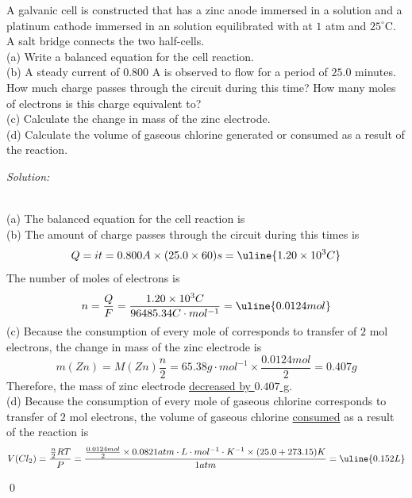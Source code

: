 \documentclass[12pt]{article}
\newenvironment{problem}[2][Problem]{\begin{trivlist}
\item[\hskip \labelsep {\bfseries #1}\hskip \labelsep {\bfseries #2.}]}{\end{trivlist}}
\newenvironment{sol}
    {\emph{Solution:}
    }
    {
    \qed
    }
\begin{document}
\begin{problem}{17.5}
A galvanic cell is constructed that has a zinc anode immersed in a  solution and a platinum cathode immersed in an  solution equilibrated with  at $1$ atm and $25^{\circ}$C. A salt bridge connects the two half-cells.\\
(a) Write a balanced equation for the cell reaction.\\
(b) A steady current of 0.800 A is observed to flow for a period of $25.0$ minutes. How much charge passes through the circuit during this time? How many moles of electrons is this charge equivalent to?\\
(c) Calculate the change in mass of the zinc electrode.\\
(d) Calculate the volume of gaseous chlorine generated or consumed as a result of the reaction.
\end{problem}
\begin{sol}
\\(a) The balanced equation for the cell reaction is \\
(b) The amount of charge passes through the circuit during this times is
\[
Q=it=0.800A\times(25.0\times60)s=\uline{1.20\times10^3C}
\]
The number of moles of electrons is
\[
n=\frac{Q}{F}=\frac{1.20\times10^3C}{96485.34C\cdot mol^{-1}}=\uline{0.0124mol}
\]
(c) Because the consumption of every mole of  corresponds to transfer of $2$ mol electrons, the change in mass of the zinc electrode is
\[
m(Zn)=M(Zn)\frac{n}{2}=65.38g\cdot mol^{-1}\times\frac{0.0124mol}{2}=0.407g
\]
Therefore, the mass of zinc electrode \uline{decreased by $0.407$ g}.\\
(d) Because the consumption of every mole of gaseous chlorine corresponds to transfer of $2$ mol electrons, the volume of gaseous chlorine \uline{consumed} as a result of the reaction is
\[
V(Cl_2)=\frac{\frac{n}{2}RT}{P}=\frac{\frac{0.0124mol}{2}\times0.0821atm\cdot L\cdot mol^{-1}\cdot K^{-1}\times(25.0+273.15)K}{1atm}=\uline{0.152L}
\]
\end{sol}
\end{document}
